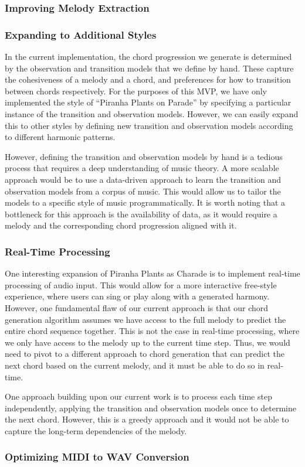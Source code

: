 \subsubsection{Improving Melody Extraction}

\subsubsection{Expanding to Additional Styles}

In the current implementation, the chord progression we generate is determined by the observation and transition models that we define by hand. These capture the cohesiveness of a melody and a chord, and preferences for how to transition between chords respectively. For the purposes of this MVP, we have only implemented the style of ``Piranha Plants on Parade'' by specifying a particular instance of the transition and observation models. However, we can easily expand this to other styles by defining new transition and observation models according to different harmonic patterns.

However, defining the transition and observation models by hand is a tedious process that requires a deep understanding of music theory. A more scalable approach would be to use a data-driven approach to learn the transition and observation models from a corpus of music. This would allow us to tailor the models to a specific style of music programmatically. It is worth noting that a bottleneck for this approach is the availability of data, as it would require a melody and the corresponding chord progression aligned with it.

\subsubsection{Real-Time Processing}

One interesting expansion of Piranha Plants as Charade is to implement real-time processing of audio input. This would allow for a more interactive free-style experience, where users can sing or play along with a generated harmony. However, one fundamental flaw of our current approach is that our chord generation algorithm assumes we have access to the full melody to predict the entire chord sequence together. This is not the case in real-time processing, where we only have access to the melody up to the current time step. Thus, we would need to pivot to a different approach to chord generation that can predict the next chord based on the current melody, and it must be able to do so in real-time.

One approach building upon our current work is to process each time step independently, applying the transition and observation models once to determine the next chord. However, this is a greedy approach and it would not be able to capture the long-term dependencies of the melody.

\subsubsection{Optimizing MIDI to WAV Conversion}
